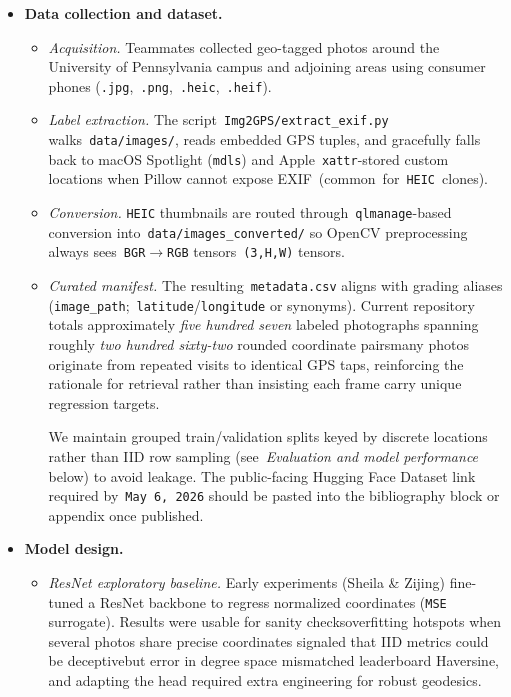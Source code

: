 \documentclass[10pt]{article}
\begin{document}
\begin{itemize}

    \item \textbf{Data collection and dataset.}
\begin{itemize}[leftmargin=1.25em]
    \item \emph{Acquisition.} Teammates collected geo-tagged photos around the University of Pennsylvania campus and adjoining areas using consumer phones (\texttt{.jpg},~\texttt{.png},~\texttt{.heic},~\texttt{.heif}).
    \item \emph{Label extraction.} The script~\texttt{Img2GPS/extract\_exif.py} walks~\texttt{data/images/}, reads embedded GPS tuples, and gracefully falls back to macOS Spotlight (\texttt{mdls}) and Apple~\texttt{xattr}-stored custom locations when Pillow cannot expose EXIF~\mbox{(common for~\texttt{HEIC} clones)}.
    \item \emph{Conversion.} \texttt{HEIC} thumbnails are routed through~\texttt{qlmanage}-based conversion into~\texttt{data/images\_converted/} so OpenCV preprocessing always sees~\texttt{BGR}$\rightarrow$\texttt{RGB} tensors~\texttt{(3,H,W)} tensors.
    \item \emph{Curated manifest.} The resulting~\texttt{metadata.csv} aligns with grading aliases (\texttt{image\_path};~\texttt{latitude}/\texttt{longitude} or synonyms). Current repository totals approximately \emph{five hundred seven} labeled photographs spanning roughly \emph{two hundred sixty-two} rounded coordinate pairs\textemdash many photos originate from repeated visits to identical GPS taps, reinforcing the rationale for retrieval rather than insisting each frame carry unique regression targets.

    We maintain grouped train/validation splits keyed by discrete locations rather than IID row sampling (see~\emph{Evaluation and model performance} below) to avoid leakage. The public-facing Hugging Face Dataset link required by~\texttt{May~6,\,2026} should be pasted into the bibliography block or appendix once published.

\end{itemize}


    \item \textbf{Model design.}
\begin{itemize}[leftmargin=1.25em]

    \item \emph{ResNet exploratory baseline.} Early experiments (Sheila \& Zijing) fine-tuned a ResNet backbone to regress normalized coordinates (\texttt{MSE} surrogate). Results were usable for sanity checks\textemdash overfitting hotspots when several photos share precise coordinates signaled that IID metrics could be deceptive\textemdash but error in degree space mismatched leaderboard Haversine, and adapting the head required extra engineering for robust geodesics.


\end{itemize}
\end{itemize}
\end{document}
